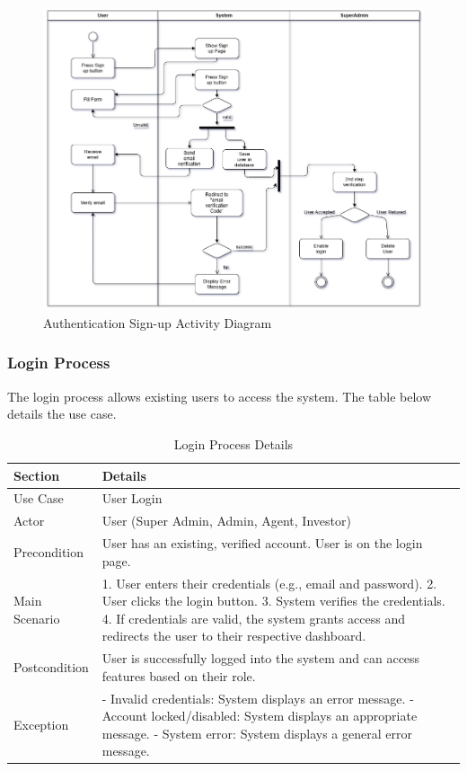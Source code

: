 \begin{figure}[ht!]
    \centering
    \includegraphics[width=1\textwidth]{images/signup_activitydiag.png}
    \caption{Authentication Sign-up Activity Diagram}
    \label{fig:signup-activity-diagram}
\end{figure}



\subsubsection{Login Process}
The login process allows existing users to access the system. The table below details the use case.

\begin{table}[htbp]
    \centering
    \begin{tabular}{|l|p{}|}
        \hline
        \textbf{Section} & \textbf{Details} \\
        \hline
        Use Case & User Login \\
        \hline
        Actor & User (Super Admin, Admin, Agent, Investor) \\
        \hline
        Precondition & User has an existing, verified account. User is on the login page. \\
        \hline
        Main Scenario & 
        1. User enters their credentials (e.g., email and password).
        2. User clicks the login button.
        3. System verifies the credentials.
        4. If credentials are valid, the system grants access and redirects the user to their respective dashboard. \\
        \hline
        Postcondition & User is successfully logged into the system and can access features based on their role. \\
        \hline
        Exception & 
        - Invalid credentials: System displays an error message.
        - Account locked/disabled: System displays an appropriate message.
        - System error: System displays a general error message. \\
        \hline
    \end{tabular}
    \caption{Login Process Details}
    \label{tab:login_process}
\end{table}

